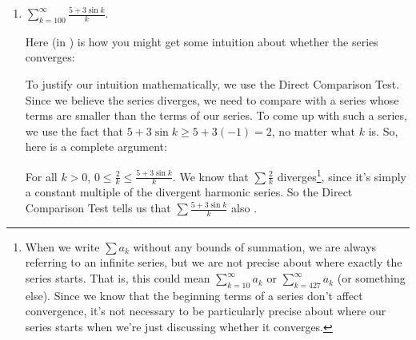 \documentclass[main]{subfiles}
\begin{document}
\begin{enumerate}
\begin{enumerate}
\begin{solution}
    We know that $0 < \frac{1}{2^k + k} < \frac{1}{2^k}$ for all $k \geq
    1$.   We also know that $\displaystyle \sum_{k=1}^\infty
    \frac{1}{2^k}$ converges, since it is a geometric series with $|r|=\frac12<1$. (We initially showed that this series converges by showing that the limit of its partial sums is finite.) So, the Direct Comparison Test says that
    $\displaystyle \sum_{k=1}^\infty \frac{1}{2^k + k}$ converges, too.
    
    Therefore, the original series $\displaystyle \sum_{k=1}^\infty \frac{-1}{2^k + k}$ .
    \end{solution}



      \item 
      \begin{problem}[1in]
      $\displaystyle \sum_{k=100}^\infty \frac{5 + 3\sin k}{k}$.
      \end{problem}

      \begin{solution}
      Here (in \ideacolor) is how you might get some intuition about
      whether the series converges: 

      To justify our intuition mathematically, we use the Direct Comparison Test.
      Since we believe the series diverges, we need to compare with a
      series whose terms are smaller than the terms of our series.  To
      come up with such a series, we use the fact that $5 + 3 \sin k \geq
      5 + 3 (-1) = 2$, no matter what $k$ is.  So, here is a complete
      argument:

      For all $k>0$, $\displaystyle 0\leq  \frac{2}{k}\leq \frac{5 + 3 \sin k}{k}$.  We know that $\displaystyle \sum \frac{2}{k}$
      diverges\footnote{When we write $\sum a_k$ without any bounds of
      summation, we are always referring to an infinite series, but we
      are not precise about where exactly the series starts.  That is,
      this could mean $\displaystyle \sum_{k=10}^\infty a_k$ or
      $\displaystyle \sum_{k=427}^\infty a_k$ (or something else).
      Since we know that the beginning terms of a series don't affect
      convergence, it's not necessary to be particularly precise about
      where our series starts when we're just discussing whether it
      converges.}, since it's simply a constant multiple of the divergent harmonic series. So the Direct Comparison
      Test tells us that $\displaystyle \sum \frac{5 + 3 \sin k}{k}$ also
      .
      \end{solution}
      

\end{enumerate}
\end{enumerate}
\end{document}

